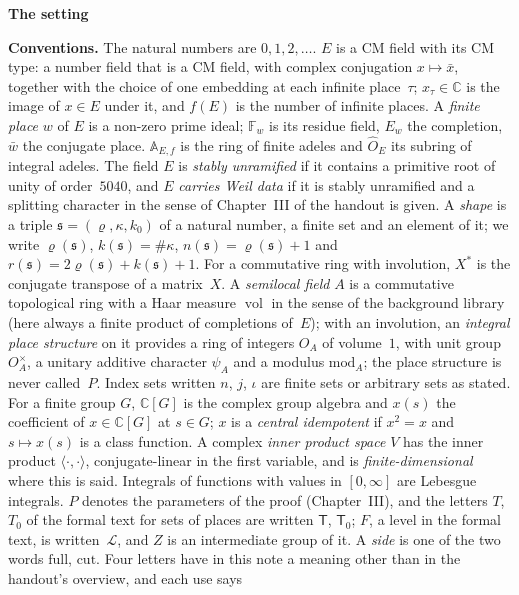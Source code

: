 \documentclass[11pt,a4paper]{article}
\newcommand{\F}{\mathbb{F}}
\newcommand{\m}[1]{\mbox{$#1$}}        %
\newcommand{\sect}[2]{\refstepcounter{section}\label{#2}\par\addvspace{19pt plus 4pt minus 2pt}\Needspace{7\baselineskip}%
  \noindent\llap{{\fontsize{13.2}{16}\selectfont\bfseries\color{inkfaint}\thesection}\hspace{9pt}}%
  {\fontsize{13.2}{16}\selectfont\bfseries\color{ink}#1}\par\nopagebreak\vspace{-1pt}}
\theoremstyle{plainx}
\theoremstyle{uprightx}
\newenvironment{conventions}{\par\addvspace{5pt}\noindent\textbf{Conventions.}\enspace\ignorespaces}{\par\addvspace{3pt}}
\newcommand{\fs}{\mathfrak{s}}                      %
\newcommand{\sT}{\mathsf{T}}                        %
\newcommand{\cL}{\mathcal{L}}                       %
\newcommand{\AEf}{\mathbb{A}_{E,f}}
\newcommand{\hO}{\hat{O}_E}
\newcommand{\full}{\mathrm{full}}
\newcommand{\cut}{\mathrm{cut}}
\newcommand{\rh}[1]{\varrho(#1)}                    %
\newcommand{\kk}[1]{k(#1)}                          %
\newcommand{\nn}[1]{n(#1)}                          %
\newcommand{\rr}[1]{r(#1)}                          %
\newcommand{\ninf}[1]{f(#1)}                        %
\newcommand{\vol}{\operatorname{vol}}
\newcommand{\CC}{\mathbb{C}}
\begin{document}
\sect{The setting}{s:setting}
\begin{conventions}\label{c:conventions}
The natural numbers are \m{0,1,2,\dots}. $E$ is a CM field with its CM type: a number field that is a CM field,
with complex conjugation \m{x\mapsto\bar x}, together with the choice of one embedding at each infinite
place~$\tau$; \m{x_\tau\in\CC} is the image of \m{x\in E} under it, and \m{\ninf{E}} is the number of infinite
places. A \emph{finite place} $w$ of $E$ is a non-zero prime ideal; \m{\F_w} is its residue field, $E_w$ the
completion, $\bar w$ the conjugate place. \m{\AEf} is the ring of finite adeles and \m{\hO} its subring of
integral adeles. The field $E$ is \emph{stably unramified} if it contains a primitive root of unity of
order~$5040$, and $E$ \emph{carries Weil data} if it is stably unramified and a splitting character in the sense
of Chapter~III of the handout is given. A \emph{shape} is a triple \m{\fs=(\varrho,\kappa,k_0)} of a natural
number, a finite set and an element of it; we write \m{\rh{\fs}}, \m{\kk{\fs}=\#\kappa}, \m{\nn{\fs}=\rh{\fs}+1}
and \m{\rr{\fs}=2\rh{\fs}+\kk{\fs}+1}. For a commutative ring with involution, $X^*$ is the conjugate transpose of
a matrix~$X$. A \emph{semilocal field} $A$ is a commutative topological ring with a Haar measure \m{\vol} in the sense of the
background library (here always a finite product of completions of~$E$); with an involution, an \emph{integral place
structure} on it provides a ring of integers $O_A$ of volume~$1$, with unit group $O_A^\times$, a unitary additive
character $\psi_A$ and a modulus \m{\mathrm{mod}_A}; the place structure is never called~$P$. Index sets written $n$, $j$, $\iota$ are finite sets or arbitrary sets as stated.
For a finite group $G$, \m{\CC[G]} is the complex group algebra and $x(s)$ the coefficient of \m{x\in\CC[G]} at
\m{s\in G}; $x$ is a \emph{central idempotent} if \m{x^2=x} and \m{s\mapsto x(s)} is a class function. A
complex \emph{inner product space} $V$ has the inner product \m{\langle\cdot,\cdot\rangle}, conjugate-linear in the
first variable, and is \emph{finite-dimensional} where this is said. Integrals of functions with values in
\m{[0,\infty]} are Lebesgue integrals. $P$ denotes the parameters of the proof (Chapter~III), and the letters
$T$, $T_0$ of the formal text for sets of places are written $\sT$, $\sT_0$; $F$, a level in the formal text, is
written~$\cL$, and $Z$ is an intermediate group of it. A \emph{side} is one of the two words \m{\full},
\m{\cut}. Four letters have in this note a meaning other than in the handout's overview, and each use says

\end{conventions}
\end{document}
